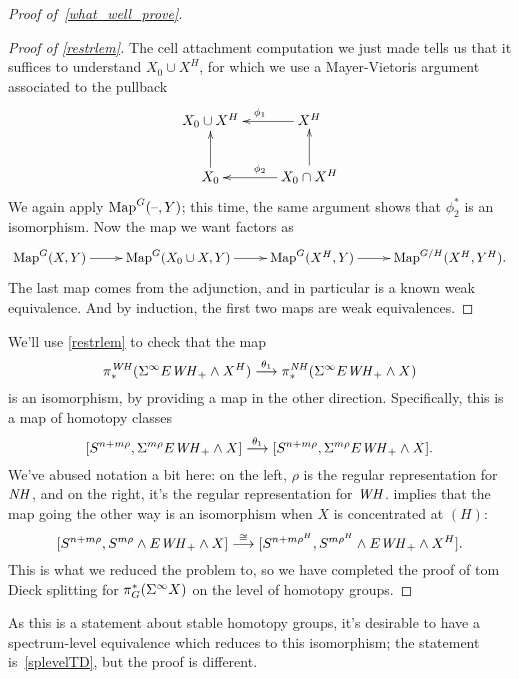 \begin{proof}[Proof of~\eqref{what_well_prove}]
\begin{proof}[Proof of \cref{restrlem}]
The cell attachment computation we just made tells us that it suffices to understand $X_0\cup X^H$, for which we
use a Mayer-Vietoris argument associated to the pullback
\[\xymatrix{
	X_0\cup X^H & X^H\ar[l]_{\phi_1}\\
	X_0\ar[u] & X_0\cap X^H\ar[l]_{\phi_2}\ar[u].
}\]
We again apply $\operatorname{Map}^G(\text{--},Y)$; this time, the same argument shows that $\phi_2^*$ is an isomorphism. Now the map
we want factors as
\[\xymatrix{
	\Map^G(X,Y)\ar[r] & \Map^G(X_0\cup X, Y)\ar[r] & \Map^G(X^H,Y)\ar[r] & \Map^{G/H}(X^H,Y^H).
}\]
The last map comes from the adjunction, and in particular is a known weak equivalence. And by induction, the first
two maps are weak equivalences.
\end{proof}
We'll use \cref{restrlem} to check that the map
\[\pi_*^{\mathit{WH}}(\Sigma^\infty E\mathit{WH}_+\wedge X^H)\stackrel{\theta_1}{\longrightarrow} \pi_*^{\mathit{NH}}(\Sigma^\infty E\mathit{WH}_+\wedge X)\]
is an isomorphism, by providing a map in the other direction. Specifically, this is a map of homotopy classes
\[[S^{n+m\rho}, \Sigma^{m\rho} E\mathit{WH}_+\wedge X]\stackrel{\theta_1}{\longrightarrow} [S^{n+m\rho}, \Sigma^{m\rho}
E\mathit{WH}_+\wedge X].\]
We've abused notation a bit here: on the left, $\rho$ is the regular representation for $\mathit{NH}$, and on the right,
it's the regular representation for $\mathit{WH}$.  implies that the map going the other way is an
isomorphism when $X$ is concentrated at $(H)$:
\[[S^{n+m\rho}, S^{m\rho}\wedge E\mathit{WH}_+\wedge X]\stackrel\cong\longrightarrow [S^{n + m\rho^H}, S^{m\rho^H}\wedge
E\mathit{WH}_+\wedge X^H].\]
This is what we reduced the problem to, so we have completed the proof of tom Dieck splitting for $\pi_G^*(\Sigma^\infty X)$
on the level of homotopy groups.
\end{proof}
As this is a statement about stable homotopy groups, it's desirable to have a spectrum-level equivalence which
reduces to this isomorphism; the statement is~\eqref{splevelTD}, but the proof is different.
